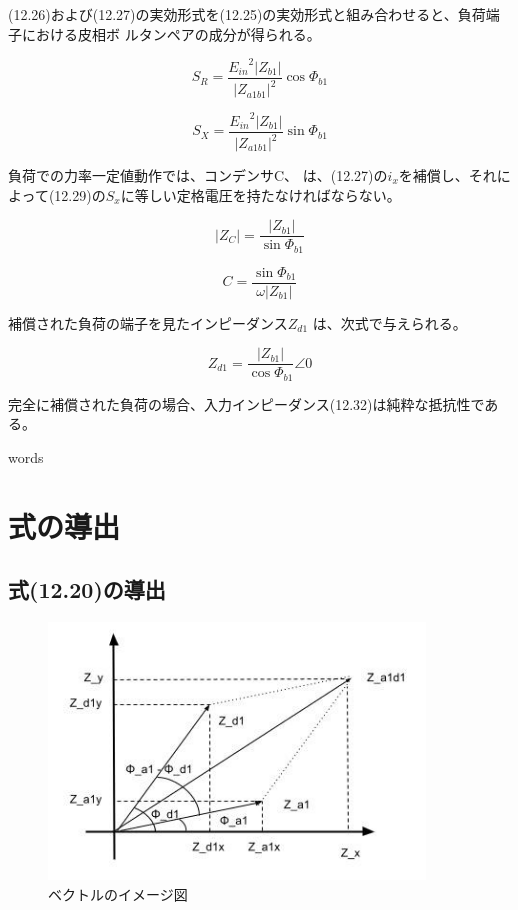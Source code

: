 \documentclass[fleqn,11pt,a4paper,dvipdfmx]{jsarticle}
\numberwithin{equation}{section}
\begin{document}
(12.26)および(12.27)の実効形式を(12.25)の実効形式と組み合わせると、負荷端子における皮相ボ ルタンペアの成分が得られる。

\begin{equation}
  S_R = \frac{{E_{in}}^2 \left|Z_{b1}\right|}{{\left|Z_{a1b1}\right|}^2}\cos\Phi_{b1}
\end{equation}

\begin{equation}
  S_X = \frac{{E_{in}}^2 \left|Z_{b1}\right|}{{\left|Z_{a1b1}\right|}^2}\sin\Phi_{b1}
\end{equation}

負荷での力率一定値動作では、コンデンサC、
は、(12.27)の$i_x$を補償し、それによって(12.29)の$S_x$に等しい定格電圧を持たなければならない。

\begin{equation}
  \left|Z_C\right| = \frac{\left|Z_{b1}\right|}{\sin \Phi_{b1}}
\end{equation}

\begin{equation}
  C = \frac{\sin \Phi_{b1}}{\omega \left|Z_{b1}\right|}
\end{equation}

補償された負荷の端子を見たインピーダンス$Z_{d1}$ は、次式で与えられる。

\begin{equation}
  Z_{d1} = \frac{\left|Z_{b1}\right|}{\cos \Phi_{b1}} \angle 0
\end{equation}

完全に補償された負荷の場合、入力インピーダンス(12.32)は純粋な抵抗性である。


\newpage
words

\newpage
\setcounter{section}{1}
\setcounter{figure}{0}
\section*{式の導出}
\subsection*{式(12.20)の導出}
\begin{figure}[b]
  \begin{center}
    \includegraphics[width=100mm]{./img/vector_Z.jpg}
    \caption{ベクトルのイメージ図}
    \label{vector_Z}
  \end{center}
\end{figure}
\end{document}
